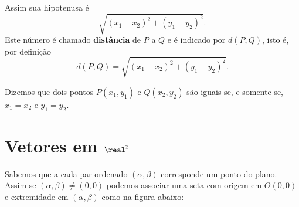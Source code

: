 Assim sua hipotenusa é
\[
    \sqrt{(x_1 - x_2)^2 + (y_1 - y_2)^2}.
\]
Este número é chamado \textbf{distância} de $P$ a $Q$ e é indicado por $d(P,Q)$, isto é, por definição
\[
    d(P,Q) = \sqrt{(x_1 - x_2)^2 + (y_1 - y_2)^2}.
\]

Dizemos que dois pontos $P(x_1,y_1)$ e $Q(x_2,y_2)$ são iguais se, e somente se, $x_1 = x_2$ e $y_1 = y_2$.


\section{Vetores em $\real^2$} %
\label{sec:vetores_plano}



Sabemos que a cada par ordenado $(\alpha, \beta)$ corresponde um ponto do plano. Assim se $(\alpha, \beta) \ne (0,0)$ podemos associar uma seta com origem em $O(0,0)$ e extremidade em $(\alpha,\beta)$ como na figura abaixo:

